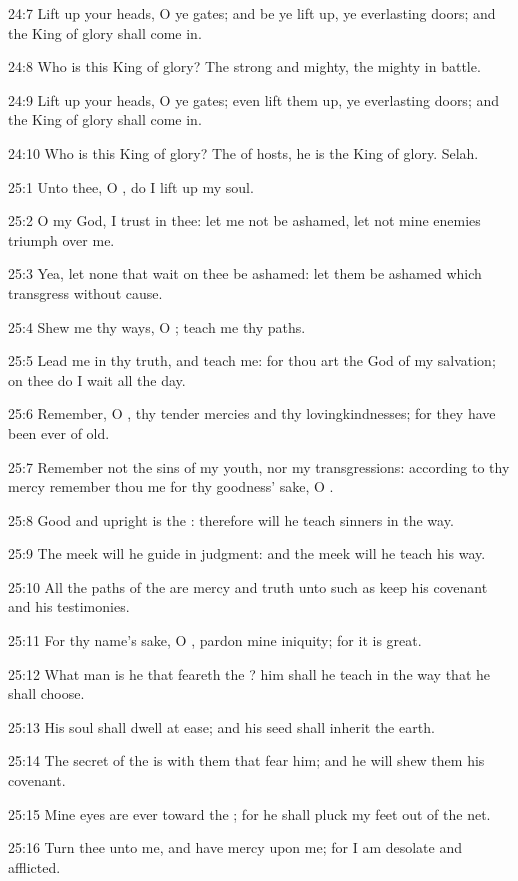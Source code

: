 24:7 Lift up your heads, O ye gates; and be ye lift up, ye everlasting
doors; and the King of glory shall come in.

24:8 Who is this King of glory? The \LORD strong and mighty, the \LORD
mighty in battle.

24:9 Lift up your heads, O ye gates; even lift them up, ye everlasting
doors; and the King of glory shall come in.

24:10 Who is this King of glory? The \LORD of hosts, he is the King of
glory. Selah.



25:1 Unto thee, O \LORD, do I lift up my soul.

25:2 O my God, I trust in thee: let me not be ashamed, let not mine
enemies triumph over me.

25:3 Yea, let none that wait on thee be ashamed: let them be ashamed
which transgress without cause.

25:4 Shew me thy ways, O \LORD; teach me thy paths.

25:5 Lead me in thy truth, and teach me: for thou art the God of my
salvation; on thee do I wait all the day.

25:6 Remember, O \LORD, thy tender mercies and thy lovingkindnesses;
for they have been ever of old.

25:7 Remember not the sins of my youth, nor my transgressions:
according to thy mercy remember thou me for thy goodness' sake, O
\LORD.

25:8 Good and upright is the \LORD: therefore will he teach sinners in
the way.

25:9 The meek will he guide in judgment: and the meek will he teach
his way.

25:10 All the paths of the \LORD are mercy and truth unto such as keep
his covenant and his testimonies.

25:11 For thy name's sake, O \LORD, pardon mine iniquity; for it is
great.

25:12 What man is he that feareth the \LORD? him shall he teach in the
way that he shall choose.

25:13 His soul shall dwell at ease; and his seed shall inherit the
earth.

25:14 The secret of the \LORD is with them that fear him; and he will
shew them his covenant.

25:15 Mine eyes are ever toward the \LORD; for he shall pluck my feet
out of the net.

25:16 Turn thee unto me, and have mercy upon me; for I am desolate and
afflicted.


